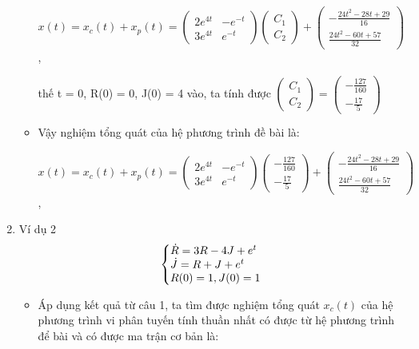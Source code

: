 \documentclass[a4paper]{article}
\begin{document}
\begin{enumerate}
\begin{itemize}
\begin{center}
                $ x(t) = x_c(t) + x_p(t) = \left( \begin{matrix} 2e^{4t} & -e^{-t} \\ 3e^{4t} & e^{-t} \end{matrix} \right) \left( \begin{matrix} C_1 \\ C_2 \end{matrix} \right) + \left( \begin{matrix} -\frac{24t^2-28t+29}{16} \\[2pt] \frac{24t^2-60t+57}{32} \end{matrix} \right)$,
        \end{center}
        thế t = 0, R(0) = 0, J(0) = 4 vào, ta tính được $\left( \begin{matrix} C_1 \\ C_2 \end{matrix} \right) = \left( \begin{matrix} -\frac{127}{160} \\[2pt] -\frac{17}{5} \end{matrix} \right)$ 
    \item Vậy nghiệm tổng quát của hệ phương trình đề bài là: 
        \begin{center}
                $ x(t) = x_c(t) + x_p(t) = \left( \begin{matrix} 2e^{4t} & -e^{-t} \\ 3e^{4t} & e^{-t} \end{matrix} \right) \left( \begin{matrix} -\frac{127}{160} \\[2pt] -\frac{17}{5} \end{matrix} \right) + \left( \begin{matrix} -\frac{24t^2-28t+29}{16} \\[2pt] \frac{24t^2-60t+57}{32} \end{matrix} \right)$,
        \end{center}
    \end{itemize}
\item Ví dụ 2  $$\left\{\begin{array}{@{}l@{}}
            \dot{R} = 3R - 4J + e^t \\
            \dot{J} =  R + J + e^t \\
            R(0) = 1, J(0) = 1
        \end{array}\right.$$
    \begin{itemize}
    \item Áp dụng kết quả từ câu 1, ta tìm được nghiệm tổng quát $x_c(t)$ của hệ phương trình vi phân tuyến tính thuần nhất có được từ hệ phương trình để bài và có được ma trận cơ bản là:

\end{itemize}
\end{enumerate}
\end{document}
